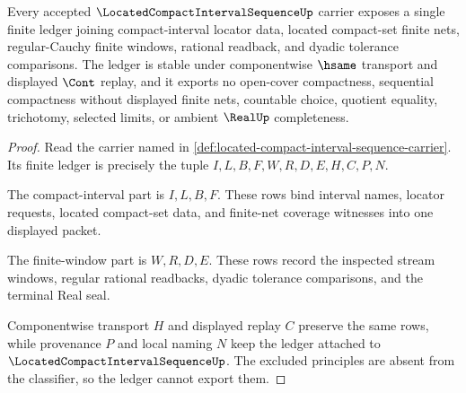 \begin{theorem}
\label{thm:located-compact-interval-sequence-ledger}
Every accepted $\LocatedCompactIntervalSequenceUp$ carrier exposes a single finite ledger joining compact-interval locator data, located compact-set finite nets, regular-Cauchy finite windows, rational readback, and dyadic tolerance comparisons. The ledger is stable under componentwise $\hsame$ transport and displayed $\Cont$ replay, and it exports no open-cover compactness, sequential compactness without displayed finite nets, countable choice, quotient equality, trichotomy, selected limits, or ambient $\RealUp$ completeness.
\end{theorem}
\begin{proof}
Read the carrier named in \autoref{def:located-compact-interval-sequence-carrier}. Its finite ledger is precisely the tuple $I,L,B,F,W,R,D,E,H,C,P,N$.

The compact-interval part is $I,L,B,F$. These rows bind interval names, locator requests, located compact-set data, and finite-net coverage witnesses into one displayed packet.

The finite-window part is $W,R,D,E$. These rows record the inspected stream windows, regular rational readbacks, dyadic tolerance comparisons, and the terminal Real seal.

Componentwise transport $H$ and displayed replay $C$ preserve the same rows, while provenance $P$ and local naming $N$ keep the ledger attached to $\LocatedCompactIntervalSequenceUp$. The excluded principles are absent from the classifier, so the ledger cannot export them.
\end{proof}




